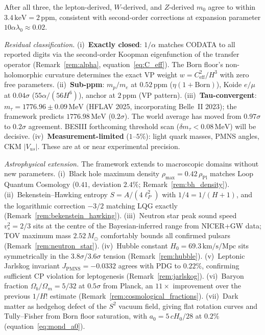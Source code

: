 \documentclass[11pt,a4paper]{article}
\theoremstyle{definition}
\theoremstyle{remark}
\begin{document}
After all three, the lepton-derived, $W$-derived, and $Z$-derived $m_0$ agree to within $3.4\,\mathrm{keV}=2\,\mathrm{ppm}$, consistent with second-order corrections at expansion parameter $10\alpha\lambda_0\approx 0.02$.

\emph{Residual classification.} (i)~\textbf{Exactly closed}: $1/\alpha$ matches CODATA to all reported digits via the second-order Koopman eigenfunction of the transfer operator (Remark~\ref{rem:alpha}, equation~\ref{eq:C_eff}). The Born floor's non-holomorphic curvature determines the exact VP weight $w=C_{\mathrm{eff}}^2/H^3$ with zero free parameters. (ii)~\textbf{Sub-ppm}: $m_p/m_e$ at $0.52\,\mathrm{ppm}$ ($\eta(1\!+\!\mathrm{Born})$), Koide $e/\mu$ at $0.04\sigma$ ($55\alpha/(56H^6)$), anchor at $2\,\mathrm{ppm}$ (VP pattern). (iii)~\textbf{Tau-convergent}: $m_\tau=1776.96\pm 0.09\,\mathrm{MeV}$ (HFLAV 2025, incorporating Belle~II 2023); the framework predicts $1776.98\,\mathrm{MeV}$ ($0.2\sigma$). The world average has moved from $0.97\sigma$ to $0.2\sigma$ agreement. BESIII forthcoming threshold scan ($\delta m_\tau<0.08\,\mathrm{MeV}$) will be decisive. (iv)~\textbf{Measurement-limited} ($1$--$5\%$): light quark masses, PMNS angles, CKM $|V_{us}|$. These are at or near experimental precision.

\emph{Astrophysical extension.} The framework extends to macroscopic domains without new parameters. (i)~Black hole maximum density $\rho_{\max}=0.42\,\rho_{\mathrm{Pl}}$ matches Loop Quantum Cosmology ($0.41$, deviation $2.4\%$; Remark~\ref{rem:bh_density}). (ii)~Bekenstein--Hawking entropy $S=A/(4\ell_P^2)$ with $1/4=1/(H+1)$, and the logarithmic correction $-3/2$ matching LQG exactly (Remark~\ref{rem:bekenstein_hawking}). (iii)~Neutron star peak sound speed $v_s^2=2/3$ sits at the centre of the Bayesian-inferred range from NICER+GW data; TOV maximum mass $2.52\,M_\odot$ comfortably bounds all confirmed pulsars (Remark~\ref{rem:neutron_star}). (iv)~Hubble constant $H_0=69.3\,\mathrm{km/s/Mpc}$ sits symmetrically in the $3.8\sigma$/$3.6\sigma$ tension (Remark~\ref{rem:hubble}). (v)~Leptonic Jarlskog invariant $J_{\mathrm{PMNS}}=-0.0332$ agrees with PDG to $0.22\%$, confirming sufficient CP violation for leptogenesis (Remark~\ref{rem:jarlskog}). (vi)~Baryon fraction $\Omega_b/\Omega_m=5/32$ at $0.5\sigma$ from Planck, an $11\times$ improvement over the previous $1/H!$ estimate (Remark~\ref{rem:cosmological_fractions}). (vii)~Dark matter as hedgehog defect of the $S^2$ vacuum field, giving flat rotation curves and Tully--Fisher from Born floor saturation, with $a_0=5\,cH_0/28$ at $0.2\%$ (equation~\ref{eq:mond_a0}).
\end{document}
